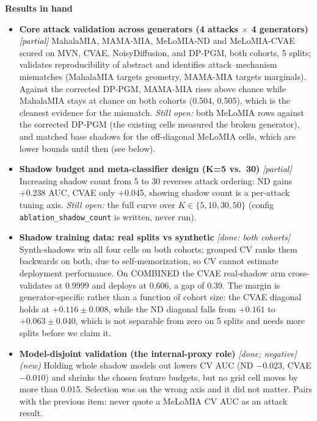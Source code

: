 
\noindent\textbf{Results in hand}
\begin{itemize}
\item \textbf{Core attack validation across generators (4 attacks $\times$ 4 generators)} \emph{[partial]} MahalaMIA, MAMA-MIA, MeLoMIA-ND and MeLoMIA-CVAE scored on MVN, CVAE, NoisyDiffusion, and DP-PGM, both cohorts, 5 splits; validates reproducibility of abstract and identifies attack--mechanism mismatches (MahalaMIA targets geometry, MAMA-MIA targets marginals). Against the corrected DP-PGM, MAMA-MIA rises above chance while MahalaMIA stays at chance on both cohorts (0.504, 0.505), which is the cleanest evidence for the mismatch. \emph{Still open:} both MeLoMIA rows against the corrected DP-PGM (the existing cells measured the broken generator), and matched base shadows for the off-diagonal MeLoMIA cells, which are lower bounds until then (see below).
\item \textbf{Shadow budget and meta-classifier design (K=5 vs.\ 30)} \emph{[partial]} Increasing shadow count from 5 to 30 reverses attack ordering: ND gains +0.238 AUC, CVAE only +0.045, showing shadow count is a per-attack tuning axis. \emph{Still open:} the full curve over $K \in \{5,10,30,50\}$ (config \texttt{ablation\_shadow\_count} is written, never run).
\item \textbf{Shadow training data: real splits vs synthetic} \emph{[done: both cohorts]} Synth-shadows win all four cells on both cohorts; grouped CV ranks them backwards on both, due to self-memorization, so CV cannot estimate deployment performance. On COMBINED the CVAE real-shadow arm cross-validates at $0.9999$ and deploys at $0.606$, a gap of $0.39$. The margin is generator-specific rather than a function of cohort size: the CVAE diagonal holds at $+0.116 \pm 0.008$, while the ND diagonal falls from $+0.161$ to $+0.063 \pm 0.040$, which is not separable from zero on 5 splits and needs more splits before we claim it.
\item \textbf{Model-disjoint validation (the internal-proxy role)} \emph{[done; negative] (new)} Holding whole shadow models out lowers CV AUC (ND $-0.023$, CVAE $-0.010$) and shrinks the chosen feature budgets, but no grid cell moves by more than 0.015. Selection was on the wrong axis and it did not matter. Pairs with the previous item: never quote a MeLoMIA CV AUC as an attack result.

\end{itemize}
